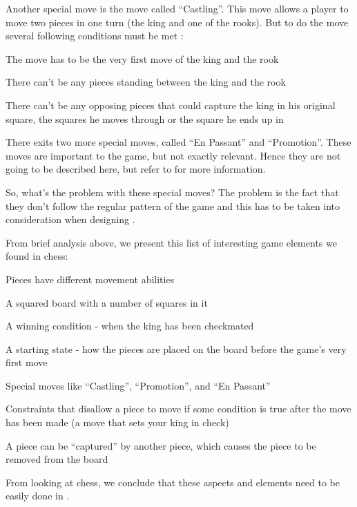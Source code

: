 Another special move is the move called ``Castling''. This move allows a player
to move two pieces in one turn (the king and one of the rooks). But to do the
move several following conditions must be met \cite{chessrules}:
\begin{nlist}
  \item The move has to be the very first move of the king and the rook
  \item There can't be any pieces standing between the king and the rook
  \item There can't be any opposing pieces that could capture the king in his original square, the squares he moves through or the square he ends up in

\end{nlist}

There exits two more special moves, called ``En Passant'' and
``Promotion''. These moves are important to the game, but not exactly
relevant. Hence they are not going to be described here, but refer to
\cite{chessrules} for more information.

So, what's the problem with these special moves? The problem is the fact that
they don't follow the regular pattern of the game and this has to be taken into
consideration when designing \productname{}.


From brief analysis above, we present this list of interesting game elements we found 
in chess:

\begin{dlist}
\item Pieces have different movement abilities
\item A squared board with a number of squares in it
\item A winning condition - when the king has been checkmated
\item A starting state - how the pieces are placed on the board before the
  game's very first move
\item Special moves like ``Castling'', ``Promotion'', and ``En Passant''
\item Constraints that disallow a piece to move if some condition is true after
  the move has been made (a move that sets your king in check)
\item A piece can be ``captured'' by another piece, which causes the piece to be
  removed from the board
\end{dlist}

From looking at chess, we conclude that these aspects and elements need to be easily done in \productname{}.
